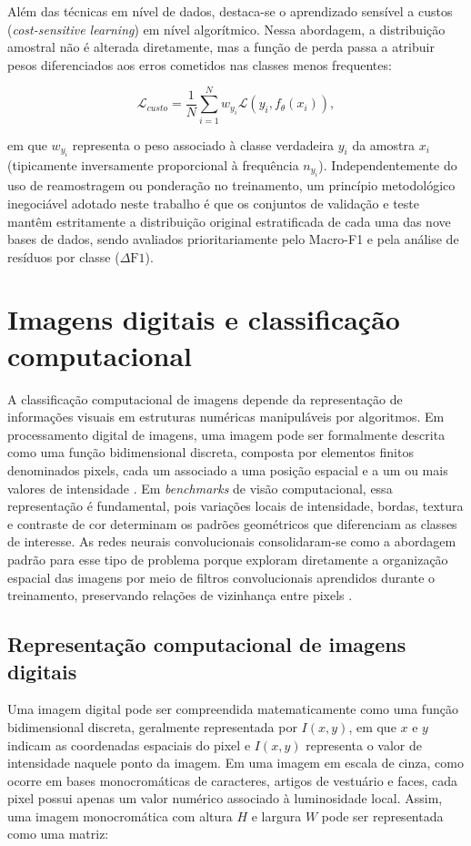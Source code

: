 \documentclass[
    12pt,
    openright,
    oneside,
    a4paper,
    english,
    brazil
]{abntex2}
\begin{document}
Além das técnicas em nível de dados, destaca-se o aprendizado sensível a custos (\textit{cost-sensitive learning}) em nível algorítmico. Nessa abordagem, a distribuição amostral não é alterada diretamente, mas a função de perda passa a atribuir pesos diferenciados aos erros cometidos nas classes menos frequentes:

\[
\mathcal{L}_{custo} =
\frac{1}{N}
\sum_{i=1}^{N}
w_{y_i}\mathcal{L}(y_i, f_{\theta}(x_i)),
\]

em que \(w_{y_i}\) representa o peso associado à classe verdadeira \(y_i\) da amostra \(x_i\) (tipicamente inversamente proporcional à frequência \(n_{y_i}\)). Independentemente do uso de reamostragem ou ponderação no treinamento, um princípio metodológico inegociável adotado neste trabalho é que os conjuntos de validação e teste mantêm estritamente a distribuição original estratificada de cada uma das nove bases de dados, sendo avaliados prioritariamente pelo Macro-F1 e pela análise de resíduos por classe (\(\Delta\text{F1}\)).

\section{Imagens digitais e classificação computacional}

A classificação computacional de imagens depende da representação de informações visuais em estruturas numéricas manipuláveis por algoritmos. Em processamento digital de imagens, uma imagem pode ser formalmente descrita como uma função bidimensional discreta, composta por elementos finitos denominados pixels, cada um associado a uma posição espacial e a um ou mais valores de intensidade \cite{gonzalez2008digital}. Em \textit{benchmarks} de visão computacional, essa representação é fundamental, pois variações locais de intensidade, bordas, textura e contraste de cor determinam os padrões geométricos que diferenciam as classes de interesse. As redes neurais convolucionais consolidaram-se como a abordagem padrão para esse tipo de problema porque exploram diretamente a organização espacial das imagens por meio de filtros convolucionais aprendidos durante o treinamento, preservando relações de vizinhança entre pixels \cite{LeCun2015}.

\subsection{Representação computacional de imagens digitais}

Uma imagem digital pode ser compreendida matematicamente como uma função bidimensional discreta, geralmente representada por \(I(x,y)\), em que \(x\) e \(y\) indicam as coordenadas espaciais do pixel e \(I(x,y)\) representa o valor de intensidade naquele ponto da imagem. Em uma imagem em escala de cinza, como ocorre em bases monocromáticas de caracteres, artigos de vestuário e faces, cada pixel possui apenas um valor numérico associado à luminosidade local. Assim, uma imagem monocromática com altura \(H\) e largura \(W\) pode ser representada como uma matriz:
\end{document}
